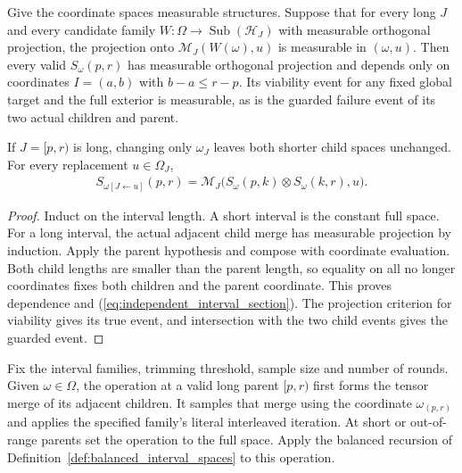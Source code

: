\begin{lemma}
    \label{lem:independent_interval_tree_sections}
    \leanok
    Give the coordinate spaces measurable structures. Suppose that for
    every long $J$ and every candidate family $W:\Omega\to\operatorname{Sub}(\mathcal H_J)$
    with measurable orthogonal projection, the projection onto
    $\mathcal M_J(W(\omega),u)$ is measurable in $(\omega,u)$.
    Then every valid $S_\omega(p,r)$ has measurable orthogonal projection and
    depends only on coordinates $I=(a,b)$ with $b-a\le r-p$.
    Its viability event for any fixed global target and the full exterior
    is measurable, as is the guarded failure event of its two actual children
    and parent.

    If $J=[p,r)$ is long, changing only $\omega_J$ leaves both shorter
    child spaces unchanged. For every replacement $u\in\Omega_J$,
    \begin{align}
        S_{\omega[J\leftarrow u]}(p,r)
        =\mathcal M_J\bigl(S_\omega(p,k)\otimes S_\omega(k,r),u\bigr).
        \label{eq:independent_interval_section}
    \end{align}
\end{lemma}
\begin{proof}\leanok
    Induct on the interval length. A short interval is the constant full
    space. For a long interval, the actual adjacent child merge has measurable
    projection by induction. Apply the parent hypothesis and compose with
    coordinate evaluation. Both child lengths are smaller than the
    parent length, so equality on all no longer coordinates fixes both
    children and the parent coordinate. This proves dependence and
    (\ref{eq:independent_interval_section}). The projection criterion for
    viability gives its true event, and intersection with the two child
    events gives the guarded event.
\end{proof}

\begin{definition}
    \label{def:canonical_interval_sampling_operation}
    \leanok
    Fix the interval families, trimming threshold, sample size and
    number of rounds. Given $\omega\in\Omega$, the operation at a valid
    long parent $[p,r)$ first forms the tensor merge of its adjacent
    children. It samples that merge using the coordinate $\omega_{(p,r)}$
    and applies the specified family's literal interleaved iteration.
    At short or out-of-range parents set the operation to the full
    space. Apply the balanced recursion of
    Definition~\ref{def:balanced_interval_spaces} to this operation.
\end{definition}


